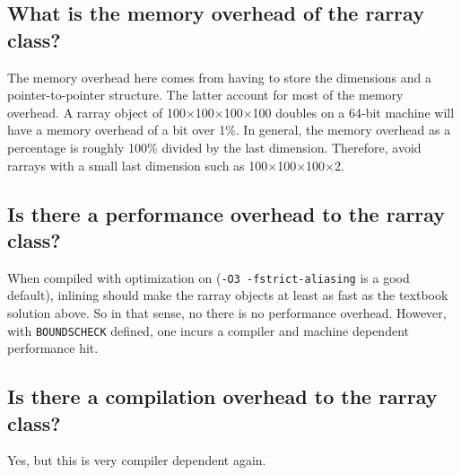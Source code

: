\documentclass[12pt,twoside]{article}
\begin{document}
\subsection{What is the memory overhead of the rarray class?}

The memory overhead here comes from having to store the dimensions and a pointer-to-pointer structure.  The latter account for most of the memory overhead.   A rarray object of 100$\times$100$\times$100$\times$100  doubles on a 64-bit machine will have a memory overhead of a bit over 1\%. In general, the memory overhead as a percentage is roughly 100\% divided by the last dimension. Therefore, avoid rarrays with a small last dimension such as 100$\times$100$\times$100$\times$2.

\subsection{Is there a performance overhead to the rarray class?}

When compiled with optimization on (\texttt{-O3 -fstrict-aliasing} is a good default), inlining should make the rarray objects at least as fast as the textbook solution above. %
So in that sense, no there is no performance overhead.  
However, with \texttt{{\tt BOUNDSCHECK}} defined, one incurs a compiler and machine dependent performance hit.


\subsection{Is there a compilation overhead to the rarray class?}

Yes, but this is very compiler dependent again.
\end{document}

